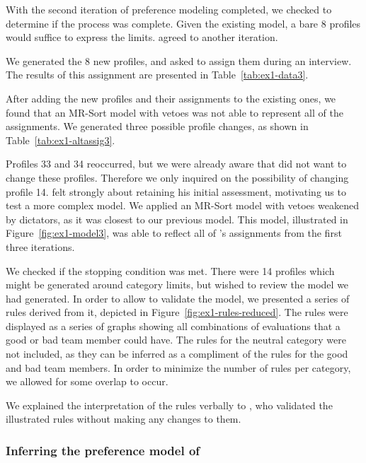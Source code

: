

With the second iteration of preference modeling completed, we checked to determine if the process was complete. Given the existing model, a bare 8 profiles would suffice to express the limits. \GJ agreed to another iteration.

We generated the $8$ new profiles, and asked \GJ to assign them during an interview. The results of this assignment are presented in Table~\ref{tab:ex1-data3}.



After adding the new profiles and their assignments to the existing ones, we found that an MR-Sort model with vetoes was not able to represent all of the assignments. We generated three possible profile changes, as shown in Table~\ref{tab:ex1-altassig3}.



Profiles 33 and 34 reoccurred, but we were already aware that \GJ did not want to change these profiles. Therefore we only inquired on the possibility of changing profile 14. \GJ felt strongly about retaining his initial assessment, motivating us to test a more complex model. We applied an MR-Sort model with vetoes weakened by dictators, as it was closest to our previous model. This model, illustrated in Figure~\ref{fig:ex1-model3}, was able to reflect all of \GJ's assignments from the first three iterations.



We checked if the stopping condition was met. There were 14 profiles which might be generated around category limits, but \GJ wished to review the model we had generated. In order to allow \GJ to validate the model, we presented a series of rules derived from it, depicted in Figure~\ref{fig:ex1-rules-reduced}. The rules were displayed as a series of graphs showing all combinations of evaluations that a good or bad team member could have. The rules for the neutral category were not included, as they can be inferred as a compliment of the rules for the good and bad team members. In order to minimize the number of rules per category, we allowed for some overlap to occur.



We explained the interpretation of the rules verbally to 
\GJ, who validated the illustrated rules without making any changes to them.

\subsubsection{Inferring the preference model of \DB}

